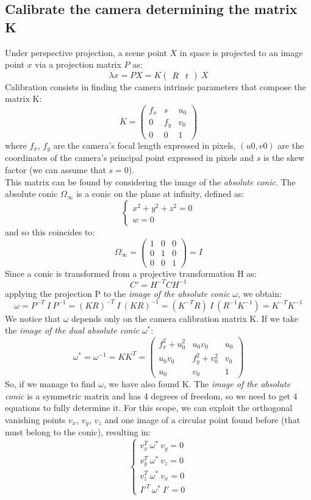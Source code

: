 \documentclass{article}
\begin{document}
\subsection{Calibrate the camera determining the matrix K}
Under perspective projection, a scene point $X$ in space is projected to an image point $x$ via a projection matrix $P$ as:
\begin{equation}
\lambda x = PX = K \begin{pmatrix} R & t \end{pmatrix} \: X
\end{equation}
Calibration consists in finding the camera intrinsic parameters that compose the matrix K:
$$ K = \begin{pmatrix}
f_x & s & u_0 \\
0 & f_y & v_0 \\
0 & 0 & 1
\end{pmatrix}
$$
where $f_x$, $f_y$ are the camera’s focal length expressed in pixels, $(u0, v0)$ are the coordinates of the camera’s principal point expressed in pixels and $s$ is the skew factor (we can assume that $s = 0$).\\
This matrix can be found by considering the image of the \textit{absolute conic}. The absolute conic $\Omega_\infty$ is a conic on the plane at infinity, defined as:
$$ \begin{cases}
x^2 + y^2 + z^2 = 0 \\
w = 0
\end{cases}
$$
and so this coincides to:
$$
\Omega_\infty = \begin{pmatrix}
1 & 0 & 0 \\
0 & 1 & 0 \\
0 & 0 & 1
\end{pmatrix} = I
$$
Since a conic is transformed from a projective transformation H as:
$$ C' = H^{-T} C H^{-1} $$
applying the projection P to the \textit{image of the absolute conic} $\omega$, we obtain:
$$
\omega = P^{-T} \: I \: P^{-1} = (KR)^{-T} \: I \: (KR)^{-1} = (K^{-T}R) \: I \: (R^{-1}K^{-1}) = K^{-T}K^{-1}
$$
We notice that $\omega$ depends only on the camera calibration matrix K.
If we take the \textit{image of the dual absolute conic} $\omega^*$:
$$ \omega^* = \omega^{-1} = KK^T = \begin{pmatrix}
f_x^2+u_0^2 & u_0v_0 & u_0 \\
u_0v_0 & f_y^2+v_0^2 & v_0 \\
u_0 & v_0 & 1
\end{pmatrix}
$$
So, if we manage to find $\omega$, we have also found K. The \textit{image of the absolute conic} is a symmetric matrix and has 4 degrees of freedom, so we need to get 4 equations to fully determine it. For this scope, we can exploit the orthogonal vanishing points $v_x$, $v_y$, $v_z$ and one image of a circular point found before (that must belong to the conic), resulting in:
$$
\begin{cases}
v_x^T \: \omega^* \: v_y = 0 \\
v_y^T \: \omega^* \: v_z = 0 \\
v_z^T \: \omega^* \: v_x = 0 \\
I'^T \: \omega^* \: I' = 0
\end{cases}
$$
\end{document}
